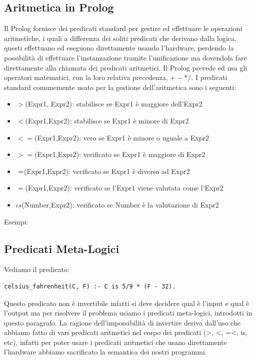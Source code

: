 \documentclass[a4paper]{book}
\begin{document}
\subsection{Aritmetica in Prolog}
Il Prolog fornisce dei predicati standard per gestire ed effettuare le operazioni aritmetiche, i quali a differenza dei soliti predicati
che derivano dalla logica, questi effettuano ed eseguono  direttamente usando l’hardware, perdendo la possibilità di effettuare
l’instanzazione tramite l’unificazione ma dovendola fare direttamente alla chiamata dei predicati aritmetici.\newline
Il Prolog prevede ed usa gli operatori matematici, con la loro relativa precedenza, $+ - * /$.\newline
I predicati standard comunemente usato per la gestione dell’aritmetica sono i seguenti:
\begin{itemize}
    \item $>$(Expr1, Expr2): stabilisce se Expr1 è maggiore dell’Expr2
    \item $<$(Expr1,Expr2): stabilisce se Expr1 è minore di Expr2
    \item $<=$(Expr1,Expr2): vero se Expr1 è minore o uguale a Expr2
    \item $>=$(Expr1,Expr2): verificato se Expr1 è maggiore di Expr2
    \item $\\=$(Expr1,Expr2): verificato se Expr1 è diverso ad Expr2
    \item $=$(Expr1,Expr2): verificato se l’Expr1 viene valutata come l’Expr2
    \item $is$(Number,Expr2): verificato se Number è la valutazione di Expr2
\end{itemize}
Esempi:

\subsection{Predicati Meta-Logici}
Vediamo il predicato:
\begin{verbatim}
celsius_fahrenheit(C, F) :- C is 5/9 * (F - 32).
\end{verbatim}
Questo predicato non è invertibile infatti si deve decidere qual è l'input e qual è l'output ma per risolvere il problema usiamo
i predicati meta-logici, introdotti in questo paragrafo.\newline
La ragione dell'impossibilità di invertire deriva dall'uso che abbiamo fatto di vari predicati aritmetici nel corpo dei predicati
(>, <, =<, is, etc), infatti per poter usare i predicati aritmetici che usano direttamente l'hardware
abbiamo sacrificato la semantica dei nostri programmi.
\end{document}
